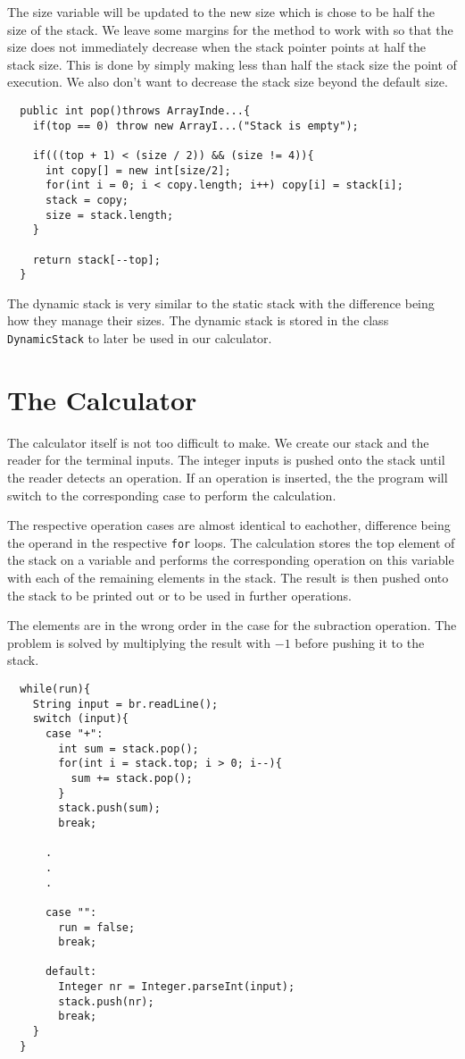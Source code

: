 \documentclass[a4paper,11pt]{article}
\begin{document}
The size variable will be updated to the new size which is chose to 
be half the size of the stack. We leave some margins for the method
to work with so that the size does not immediately decrease when the
stack pointer points at half the stack size. This is done by simply
making less than half the stack size the point of execution. We
also don't want to decrease the stack size beyond the default size.

\begin{verbatim}
  public int pop()throws ArrayInde...{
    if(top == 0) throw new ArrayI...("Stack is empty");
    
    if(((top + 1) < (size / 2)) && (size != 4)){
      int copy[] = new int[size/2];
      for(int i = 0; i < copy.length; i++) copy[i] = stack[i];
      stack = copy;
      size = stack.length;
    }

    return stack[--top];
  }
\end{verbatim}

The dynamic stack is very similar to the static stack with the
difference being how they manage their sizes. The dynamic stack 
is stored in the class {\tt DynamicStack} to later be used in our 
calculator. 

\section*{The Calculator}

The calculator itself is not too difficult to make. We create our 
stack and the reader for the terminal inputs. The integer inputs is
pushed onto the stack until the reader detects an operation. If an
operation is inserted, the the program will switch to the 
corresponding case to perform the calculation.

The respective operation cases are almost identical to eachother,
difference being the operand in the respective {\tt for} loops.
The calculation stores the top element of the stack on a variable and
performs the corresponding operation on this variable with each of
the remaining elements in the stack. The result is then pushed onto
the stack to be printed out or to be used in further operations.

The elements are in the wrong order in the case for the subraction 
operation. The problem is solved by multiplying the result with $ -1$
before pushing it to the stack.

\begin{verbatim}
  while(run){
    String input = br.readLine();
    switch (input){
      case "+":
        int sum = stack.pop();
        for(int i = stack.top; i > 0; i--){
          sum += stack.pop();
        }
        stack.push(sum);
        break;

      .
      .
      .

      case "":
        run = false;
        break;
      
      default:
        Integer nr = Integer.parseInt(input);
        stack.push(nr);
        break;
    }
  }
\end{verbatim}
\end{document}
